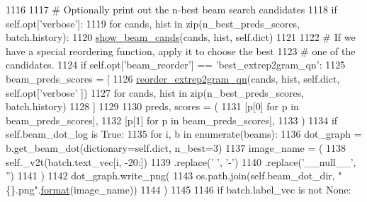 \begin{DoxyCode}
1116 
1117             \textcolor{comment}{# Optionally print out the n-best beam search candidates}
1118             \textcolor{keywordflow}{if} self.opt[\textcolor{stringliteral}{'verbose'}]:
1119                 \textcolor{keywordflow}{for} cands, hist \textcolor{keywordflow}{in} zip(n\_best\_preds\_scores, batch.history):
1120                     \hyperlink{namespaceprojects_1_1controllable__dialogue_1_1controllable__seq2seq_1_1util_ad8bee76107b49379c621746db6fd7d4e}{show\_beam\_cands}(cands, hist, self.dict)
1121 
1122             \textcolor{comment}{# If we have a special reordering function, apply it to choose the best}
1123             \textcolor{comment}{# one of the candidates.}
1124             \textcolor{keywordflow}{if} self.opt[\textcolor{stringliteral}{'beam\_reorder'}] == \textcolor{stringliteral}{'best\_extrep2gram\_qn'}:
1125                 beam\_preds\_scores = [
1126                     \hyperlink{namespaceprojects_1_1controllable__dialogue_1_1controllable__seq2seq_1_1util_aa1ba917d170af0191d23b033358bc9eb}{reorder\_extrep2gram\_qn}(cands, hist, self.dict, self.opt[\textcolor{stringliteral}{'verbose'}
      ])
1127                     \textcolor{keywordflow}{for} cands, hist \textcolor{keywordflow}{in} zip(n\_best\_preds\_scores, batch.history)
1128                 ]
1129 
1130             preds, scores = (
1131                 [p[0] \textcolor{keywordflow}{for} p \textcolor{keywordflow}{in} beam\_preds\_scores],
1132                 [p[1] \textcolor{keywordflow}{for} p \textcolor{keywordflow}{in} beam\_preds\_scores],
1133             )
1134             \textcolor{keywordflow}{if} self.beam\_dot\_log \textcolor{keywordflow}{is} \textcolor{keyword}{True}:
1135                 \textcolor{keywordflow}{for} i, b \textcolor{keywordflow}{in} enumerate(beams):
1136                     dot\_graph = b.get\_beam\_dot(dictionary=self.dict, n\_best=3)
1137                     image\_name = (
1138                         self.\_v2t(batch.text\_vec[i, -20:])
1139                         .replace(\textcolor{stringliteral}{' '}, \textcolor{stringliteral}{'-'})
1140                         .replace(\textcolor{stringliteral}{'\_\_null\_\_'}, \textcolor{stringliteral}{''})
1141                     )
1142                     dot\_graph.write\_png(
1143                         os.path.join(self.beam\_dot\_dir, \textcolor{stringliteral}{"\{\}.png"}.\hyperlink{namespaceparlai_1_1chat__service_1_1services_1_1messenger_1_1shared__utils_a32e2e2022b824fbaf80c747160b52a76}{format}(image\_name))
1144                     )
1145 
1146         \textcolor{keywordflow}{if} batch.label\_vec \textcolor{keywordflow}{is} \textcolor{keywordflow}{not} \textcolor{keywordtype}{None}:

\end{DoxyCode}
